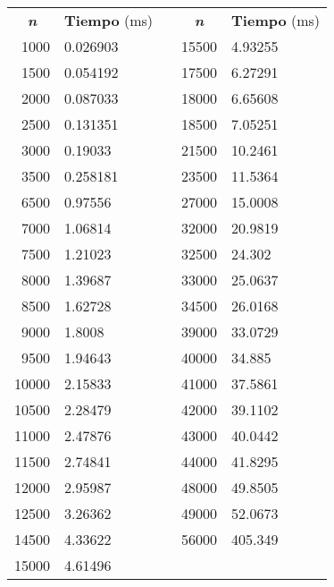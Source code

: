 \documentclass[10pt, a4paper]{article}
\theoremstyle{theorem-style}
\theoremstyle{theorem-style}
\theoremstyle{definition-style}
\theoremstyle{remark-style}
\theoremstyle{example-style}
\theoremstyle{definition-style}
\theoremstyle{remark-style}
\begin{document}
\begin{table}[h]
\centering
\begin{tabular}{|r|l|l|r|l|}
\cline{1-2} \cline{4-5}
\multicolumn{1}{c}{\cellcolor[HTML]{80CBC4}\textbf{\emph{n}}} & \multicolumn{1}{c}{\cellcolor[HTML]{80CBC4}\textbf{Tiempo} (ms)} && \multicolumn{1}{c}{\cellcolor[HTML]{80CBC4}\textbf{\emph{n}}} & \multicolumn{1}{c}{\cellcolor[HTML]{80CBC4}\textbf{Tiempo} (ms)}\\
\cline{1-2} \cline{4-5}
1000&0.026903&& 15500&4.93255 \\
1500&0.054192& &17500&6.27291 \\
2000&0.087033 &&18000&6.65608 \\
2500&0.131351 &&18500&7.05251 \\ 
3000&0.19033 &&21500&10.2461 \\
3500&0.258181 &&23500&11.5364 \\
6500&0.97556 &&27000&15.0008 \\
7000&1.06814 &&32000&20.9819 \\
7500&1.21023 &&32500&24.302 \\ 
8000&1.39687 &&33000&25.0637 \\ 
8500&1.62728 &&34500&26.0168 \\
9000&1.8008 &&39000&33.0729 \\
9500&1.94643 &&40000&34.885 \\
10000&2.15833 &&41000&37.5861 \\
10500&2.28479 &&42000&39.1102 \\
11000&2.47876 &&43000&40.0442 \\
11500&2.74841 &&44000&41.8295 \\
12000&2.95987 &&48000&49.8505 \\
12500&3.26362 &&49000&52.0673 \\
14500&4.33622 &&56000&405.349 \\
\cline{4-5}
15000&4.61496 \\
\cline{1-2} 
\end{tabular}
\end{table}
\pagebreak
\vspace*{5.5cm}
\begin{center}
\end{center}
\end{document}
